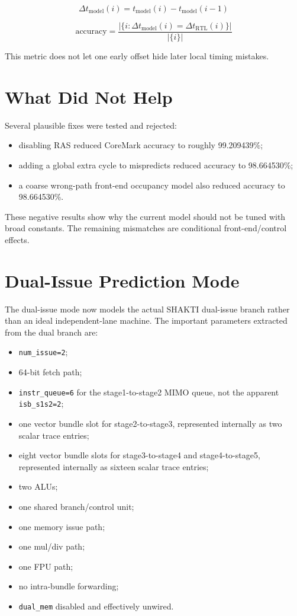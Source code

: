\documentclass[11pt]{article}
\begin{document}
\[
\Delta t_{\mathrm{model}}(i) = t_{\mathrm{model}}(i) - t_{\mathrm{model}}(i-1)
\]

\[
\mathrm{accuracy} =
\frac{|\{i : \Delta t_{\mathrm{model}}(i) =
\Delta t_{\mathrm{RTL}}(i)\}|}{|\{i\}|}
\]

This metric does not let one early offset hide later local timing mistakes.

\section{What Did Not Help}

Several plausible fixes were tested and rejected:

\begin{itemize}
  \item disabling RAS reduced CoreMark accuracy to roughly 99.209439\%;
  \item adding a global extra cycle to mispredicts reduced accuracy to 98.664530\%;
  \item a coarse wrong-path front-end occupancy model also reduced accuracy to
        98.664530\%.
\end{itemize}

These negative results show why the current model should not be tuned with broad
constants. The remaining mismatches are conditional front-end/control effects.

\section{Dual-Issue Prediction Mode}

The dual-issue mode now models the actual SHAKTI dual-issue branch rather than
an ideal independent-lane machine. The important parameters extracted from the
dual branch are:

\begin{itemize}
  \item \texttt{num\_issue=2};
  \item 64-bit fetch path;
  \item \texttt{instr\_queue=6} for the stage1-to-stage2 MIMO queue, not the
        apparent \texttt{isb\_s1s2=2};
  \item one vector bundle slot for stage2-to-stage3, represented internally as
        two scalar trace entries;
  \item eight vector bundle slots for stage3-to-stage4 and stage4-to-stage5,
        represented internally as sixteen scalar trace entries;
  \item two ALUs;
  \item one shared branch/control unit;
  \item one memory issue path;
  \item one mul/div path;
  \item one FPU path;
  \item no intra-bundle forwarding;
  \item \texttt{dual\_mem} disabled and effectively unwired.
\end{itemize}
\end{document}

